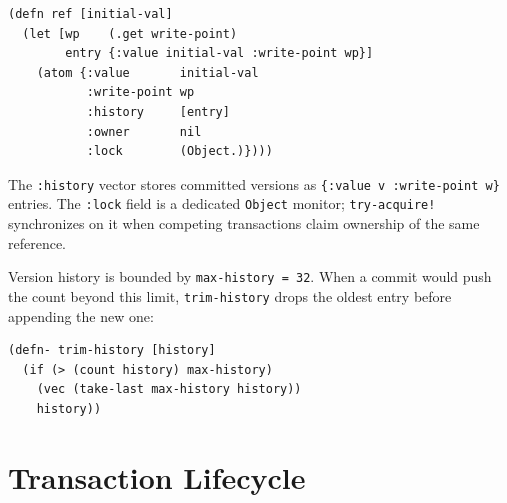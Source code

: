 \begin{listing}[H]
  \begin{verbatim}
(defn ref [initial-val]
  (let [wp    (.get write-point)
        entry {:value initial-val :write-point wp}]
    (atom {:value       initial-val
           :write-point wp
           :history     [entry]
           :owner       nil
           :lock        (Object.)})))
\end{verbatim}
  \caption{Reference structure.}
  \label{lst:ref-structure}
\end{listing}

The \texttt{:history} vector stores committed versions as
\texttt{\{:value v :write-point w\}} entries. The \texttt{:lock} field is a
dedicated \texttt{Object} monitor; \texttt{try-acquire!} synchronizes on it
when competing transactions claim ownership of the same reference.

Version history is bounded by \texttt{max-history = 32}. When a commit would
push the count beyond this limit, \texttt{trim-history} drops the oldest
entry before appending the new one:

\begin{listing}[H]
  \begin{verbatim}
(defn- trim-history [history]
  (if (> (count history) max-history)
    (vec (take-last max-history history))
    history))
\end{verbatim}
  \caption{History trimming.}
  \label{lst:trim-history}
\end{listing}

\section{Transaction Lifecycle}

